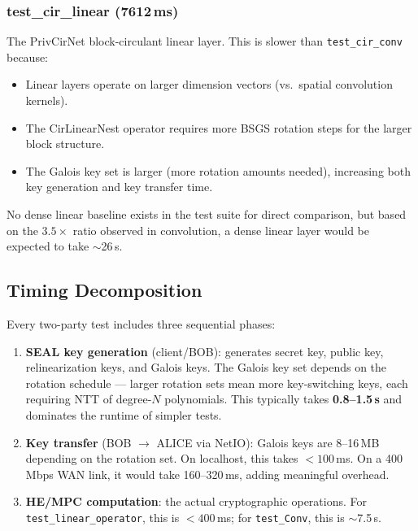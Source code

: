 \subsubsection{test\_cir\_linear (7612\,ms)}

The PrivCirNet block-circulant linear layer. This is slower than \texttt{test\_cir\_conv} because:
\begin{itemize}[nosep]
  \item Linear layers operate on larger dimension vectors (vs.\ spatial convolution kernels).
  \item The CirLinearNest operator requires more BSGS rotation steps for the larger block structure.
  \item The Galois key set is larger (more rotation amounts needed), increasing both key generation and key transfer time.
\end{itemize}

No dense linear baseline exists in the test suite for direct comparison, but based on the $3.5\times$ ratio observed in convolution, a dense linear layer would be expected to take $\sim$26\,s.

\subsection{Timing Decomposition}

Every two-party test includes three sequential phases:

\begin{enumerate}[nosep]
  \item \textbf{SEAL key generation} (client/BOB): generates secret key, public key, relinearization keys, and Galois keys. The Galois key set depends on the rotation schedule --- larger rotation sets mean more key-switching keys, each requiring NTT of degree-$N$ polynomials. This typically takes \textbf{0.8--1.5\,s} and dominates the runtime of simpler tests.
  \item \textbf{Key transfer} (BOB $\to$ ALICE via NetIO): Galois keys are 8--16\,MB depending on the rotation set. On localhost, this takes $<100$\,ms. On a 400\,Mbps WAN link, it would take 160--320\,ms, adding meaningful overhead.
  \item \textbf{HE/MPC computation}: the actual cryptographic operations. For \texttt{test\_linear\_operator}, this is $<400$\,ms; for \texttt{test\_Conv}, this is $\sim$7.5\,s.
\end{enumerate}

